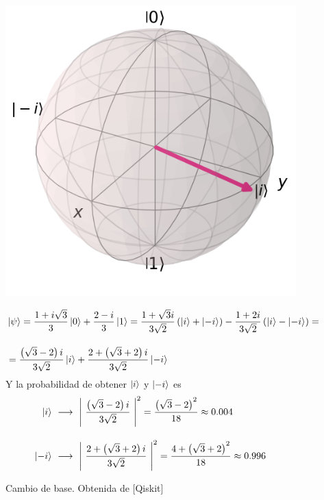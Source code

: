 \documentclass{article}
\numberwithin{equation}{section} %
\begin{document}
    \begin{figure}[h!]
        \centering
        \begin{minipage}{0.3\textwidth}
            \includegraphics[width=\textwidth]{img/Bloch/bloch_change_basis_example_2.png}  
        \end{minipage}
        \hfill
        \begin{minipage}{0.65\textwidth}
            \begin{align*}
                &\ket{\psi} = \frac{1 + i \sqrt{3}}{3} \ket{0} + \frac{2 - i}{3} \ket{1} = \frac{1 + \sqrt{3}i}{3 \sqrt{2}} \left( \ket{i} + \ket{-i} \right) - \frac{1 + 2i}{3 \sqrt{2}} \left( \ket{i} - \ket{-i} \right) = \\[10pt]
                &=  \frac{\left( \sqrt{3} - 2 \right)i}{3 \sqrt{2}} \ket{i} + \frac{2 + \left( \sqrt{3} + 2 \right) i}{3 \sqrt{2}} \ket{-i}
            \end{align*}
            Y la probabilidad de obtener \( \ket{i} \) y \( \ket{-i} \) es
            \begin{align*}
                \ket{i} \ &\longrightarrow \ \left| \ \frac{\left( \sqrt{3} - 2 \right) i}{3 \sqrt{2}} \ \right| ^ {2} = \frac{\left( \sqrt{3} - 2 \right) ^ {2}}{18} \approx 0.004 \\[10pt]
                \ket{-i} \ &\longrightarrow \ \left| \ \frac{2 + \left( \sqrt{3} + 2 \right) i}{3 \sqrt{2}} \ \right| ^ {2} = \frac{4 + \left( \sqrt{3} + 2 \right) ^ {2}}{18} \approx 0.996
            \end{align*}
        \end{minipage}
        \caption{Cambio de base. Obtenida de [Qiskit]}\label{fig: bloch_ejemplo_medicion_3} 
    \end{figure}
\end{document}
